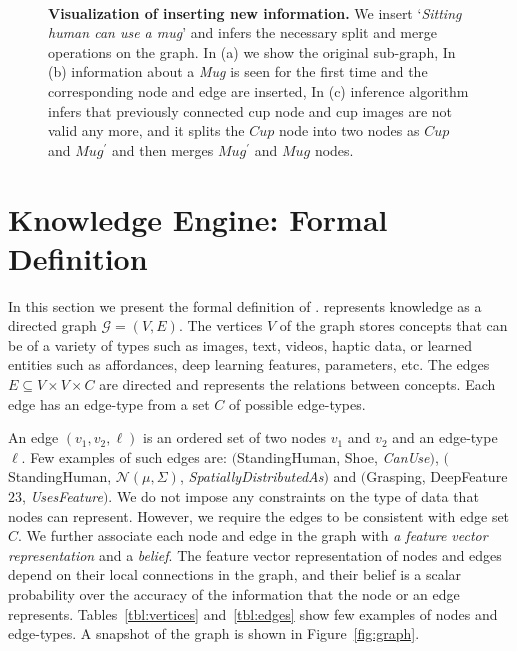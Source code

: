 
\begin{figure}[t]
\centering
{}~

\caption{\textbf{Visualization of inserting new information.} We insert `\emph{Sitting human can use a mug}' and \robobrain{} infers the necessary split and merge operations on the graph. In (a) we show the original sub-graph, In (b) information about a \emph{Mug} is seen for the first time and the corresponding node and edge are inserted, In (c) inference algorithm infers that previously connected cup node and  cup images are not valid any more, and it splits the $Cup$ node into two nodes as $Cup$ and $Mug^\prime$ and then merges $Mug^\prime$ and $Mug$ nodes.}
\label{insertgraph}
\end{figure}


\section{Knowledge Engine: Formal Definition}
\label{sec:graph}

In this section we present the formal definition of \mbox{\robobrain{}}.
\robobrain{} represents knowledge as a directed graph $\mathcal{G}=(V,E)$.
The vertices $V$ of the graph stores concepts that can  be of a variety
of types such as images, text, videos, haptic data, or  learned entities such as affordances, deep learning features, parameters, etc.
The edges $E \subseteq V\times V\times C$ are directed and represents the relations between concepts. Each edge has an edge-type from a set $C$ of possible edge-types.

An edge $(v_1,v_2,\ell)$ is an ordered set of two nodes $v_1$ and $v_2$ and an edge-type  $\ell$.
Few examples of such edges are: $($StandingHuman, Shoe, \emph{CanUse}$)$,
$($StandingHuman, $\mathcal{N}(\mu,\Sigma)$, \emph{SpatiallyDistributedAs}$)$
and $($Grasping, DeepFeature$23$, \emph{UsesFeature}$)$. %
We do not impose any constraints on the type of data that nodes can represent. However, we require the edges to be consistent with \robobrain{} edge set $C$. We further associate each node and edge in the graph with \textit{a feature vector representation} and a \textit{belief}. The feature vector representation of nodes and edges depend on their local connections in the graph, and their belief is a scalar probability over the accuracy of the information that the node or an edge represents. Tables~\ref{tbl:vertices} and~\ref{tbl:edges} show few examples of nodes and edge-types. A snapshot of the graph is shown in  Figure~\ref{fig:graph}.

